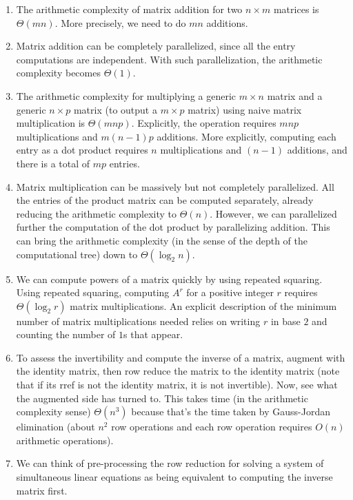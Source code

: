 \documentclass[10pt]{amsart}
\begin{document}
\begin{enumerate}
\item The arithmetic complexity of matrix addition for two $n \times
  m$ matrices is $\Theta (mn)$. More precisely, we need to do $mn$
  additions.
\item Matrix addition can be completely parallelized, since all the
  entry computations are independent. With such parallelization, the
  arithmetic complexity becomes $\Theta(1)$.
\item The arithmetic complexity for multiplying a generic $m \times n$
  matrix and a generic $n \times p$ matrix (to output a $m \times p$
  matrix) using naive matrix multiplication is
  $\Theta(mnp)$. Explicitly, the operation requires $mnp$
  multiplications and $m(n-1)p$ additions. More explicitly, computing
  each entry as a dot product requires $n$ multiplications and $(n -
  1)$ additions, and there is a total of $mp$ entries.
\item Matrix multiplication can be massively but not completely
  parallelized. All the entries of the product matrix can be computed
  separately, already reducing the arithmetic complexity to
  $\Theta(n)$. However, we can parallelized further the computation of
  the dot product by parallelizing addition. This can bring the
  arithmetic complexity (in the sense of the depth of the
  computational tree) down to $\Theta(\log_2n)$.
\item We can compute powers of a matrix quickly by using repeated
  squaring. Using repeated squaring, computing $A^r$ for a positive
  integer $r$ requires $\Theta(\log_2r)$ matrix multiplications. An
  explicit description of the minimum number of matrix multiplications
  needed relies on writing $r$ in base $2$ and counting the number of
  $1$s that appear.
\item To assess the invertibility and compute the inverse of a matrix,
  augment with the identity matrix, then row reduce the matrix to the
  identity matrix (note that if its rref is not the identity matrix,
  it is not invertible). Now, see what the augmented side has turned
  to. This takes time (in the arithmetic complexity sense)
  $\Theta(n^3)$ because that's the time taken by Gauss-Jordan
  elimination (about $n^2$ row operations and each row operation
  requires $O(n)$ arithmetic operations).
\item We can think of pre-processing the row reduction for solving a
  system of simultaneous linear equations as being equivalent to
  computing the inverse matrix first.
\end{enumerate}
\end{document}
